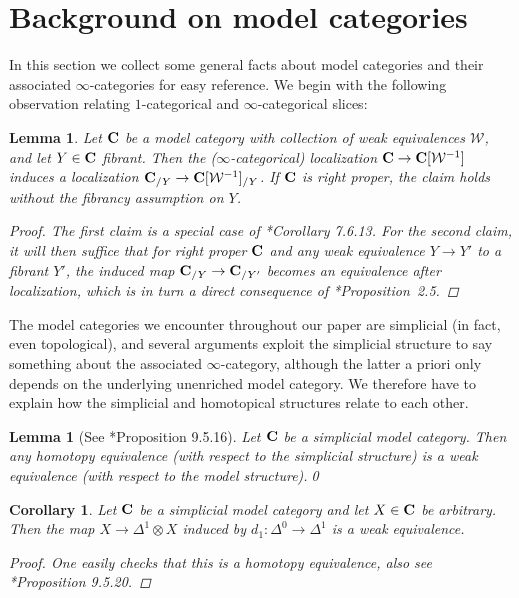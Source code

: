 \documentclass[reqno]{memo-l}
\theoremstyle{mythm}
\newtheorem{lemma}[thm]{Lemma}
\newtheorem{cor}[thm]{Corollary}
\theoremstyle{definition}
\numberwithin{equation}{section}
\newcommand{\Ww}{{\mathcal{W}}}
\newcommand{\cat}[1]{\textbf{\textup{#1}}}
\begin{document}
\section[Background on model categories]{Background on model categories}\label{app:model-cat}
In this section we collect some general facts about model categories and their associated $\infty$-categories for easy reference. We begin with the following observation relating $1$-categorical and $\infty$-categorical slices:

\begin{lemma}\label{lemma:slice-over-fibrant}
    Let $\cat{C}$ be a model category with collection of weak equivalences $\Ww$, and let $Y\in\cat{C}$ fibrant. Then the ($\infty$-categorical) localization $\cat{C}\to\cat{C}[\Ww^{-1}]$ induces a localization $\cat{C}_{/Y}\to\cat{C}[\Ww^{-1}]_{/Y}$. If $\cat{C}$ is right proper, the claim holds without the fibrancy assumption on $Y$.
    \begin{proof}
        The first claim is a special case of \cite{cisinski-book}*{Corollary 7.6.13}. For the second claim, it will then suffice that for right proper $\cat{C}$ and any weak equivalence $Y\to Y'$ to a fibrant $Y'$, the induced map $\cat{C}_{/Y}\to\cat{C}_{/Y'}$ becomes an equivalence after localization, which is in turn a direct consequence of \cite{rezk-proper}*{Proposition~2.5}.
    \end{proof}
\end{lemma}

The model categories we encounter throughout our paper are simplicial (in fact, even topological), and several arguments exploit the simplicial structure to say something about the associated $\infty$-category, although the latter a priori only depends on the underlying unenriched model category. We therefore have to explain how the simplicial and homotopical structures relate to each other.

\begin{lemma}[See \cite{hirschhorn-book}*{Proposition 9.5.16}]\label{lemma:hom-equiv-we}
    Let $\cat{C}$ be a simplicial model category. Then any homotopy equivalence (with respect to the simplicial structure) is a weak equivalence (with respect to the model structure).\qed
\end{lemma}

\begin{cor}
    Let $\cat{C}$ be a simplicial model category and let $X\in\cat{C}$ be arbitrary. Then the map $X\to \Delta^1\otimes X$ induced by $d_1\colon\Delta^0\to\Delta^1$ is a weak equivalence.
    \begin{proof}
        One easily checks that this is a homotopy equivalence, also see \cite{hirschhorn-book}*{Proposition 9.5.20}.
    \end{proof}
\end{cor}
\end{document}
